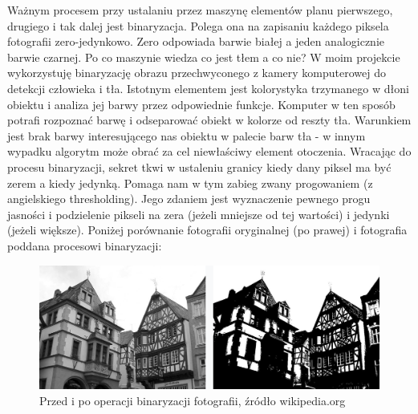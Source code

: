 \documentclass{article}
\begin{document}
	\par
	Ważnym procesem przy ustalaniu przez maszynę elementów planu pierwszego, drugiego i tak dalej jest binaryzacja. Polega ona na zapisaniu każdego piksela fotografii zero-jedynkowo. Zero odpowiada barwie białej a jeden analogicznie barwie czarnej. Po co maszynie wiedza co jest tłem a co nie? W moim projekcie wykorzystuję binaryzację obrazu przechwyconego z kamery komputerowej do detekcji człowieka i tła. Istotnym elementem jest kolorystyka trzymanego w dłoni obiektu i analiza jej barwy przez odpowiednie funkcje. Komputer w ten sposób potrafi rozpoznać barwę i odseparować obiekt w kolorze od reszty tła. Warunkiem jest brak barwy interesującego nas obiektu w palecie barw tła - w innym wypadku algorytm może obrać za cel niewłaściwy element otoczenia. Wracając do procesu binaryzacji, sekret tkwi w ustaleniu granicy kiedy dany piksel ma być zerem a kiedy jedynką. Pomaga nam w tym zabieg zwany progowaniem (z angielskiego thresholding). Jego zdaniem jest wyznaczenie pewnego progu jasności i podzielenie pikseli na zera (jeżeli mniejsze od tej wartości) i jedynki (jeżeli większe). Poniżej porównanie fotografii oryginalnej (po prawej) i fotografia poddana procesowi binaryzacji:
	\begin{figure}
		\centering
		\includegraphics[width=15cm]{binary}
		\caption{Przed i po operacji binaryzacji fotografii, źródło wikipedia.org}
	\end{figure}
\end{document}
